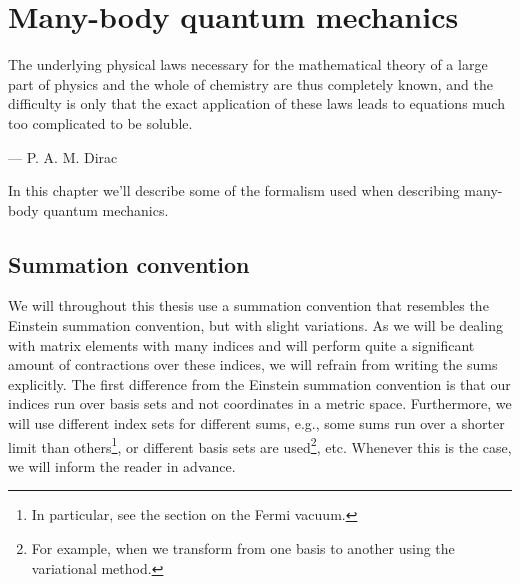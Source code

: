 \chapter{Many-body quantum mechanics}
    \epigraph{The underlying physical laws necessary for the mathematical
    theory of a large part of physics and the whole of chemistry are thus
    completely known, and the difficulty is only that the exact application of
    these laws leads to equations much too complicated to be soluble.}
    {--- P. A. M. Dirac}

    In this chapter we'll describe some of the formalism used when describing
    many-body quantum mechanics.

    \section{Summation convention}
        We will throughout this thesis use a summation convention that
        resembles the Einstein summation convention, but with slight
        variations.
        As we will be dealing with matrix elements with many indices and will
        perform quite a significant amount of contractions over these indices,
        we will refrain from writing the sums explicitly.
        The first difference from the Einstein summation convention is that our
        indices run over basis sets and not coordinates in a metric space.
        Furthermore, we will use different index sets for different sums, e.g.,
        some sums run over a shorter limit than others\footnote{%
            In particular, see the section on the Fermi vacuum.%
        }, or different basis sets are used\footnote{%
            For example, when we transform from one basis to another using the
            variational method.%
        }, etc.
        Whenever this is the case, we will inform the reader in advance.

